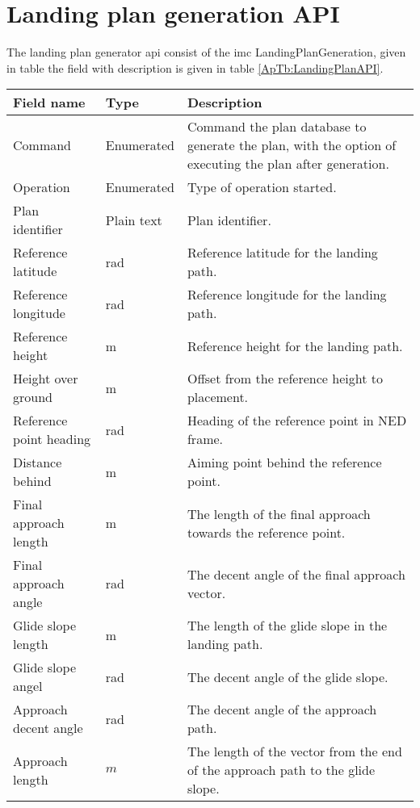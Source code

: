 \chapter{Landing plan generation API}\label{AP:APIIMC}
The landing plan generator \gls{api} consist of the \gls{imc} LandingPlanGeneration, given in table  the field with description is given in table \ref{ApTb:LandingPlanAPI}.
\begin{table}
\centering
\begin{tabular}{| p{4cm} | p{2cm} | p{6cm} |}
\hline
\textbf{Field name}	& \textbf{Type}	& \textbf{Description} \\ \hline
Command								& Enumerated	& Command the plan database to generate the plan, with the option of executing the plan after generation. \\ \hline
Operation							& Enumerated	& Type of operation started.	\\ \hline
Plan identifier						& Plain text	& Plan identifier.	\\ \hline
Reference latitude					& rad			& Reference latitude for the landing path.	\\ \hline
Reference longitude					& rad			& Reference longitude for the landing path.	\\ \hline
Reference height					& m				& Reference height for the landing path.	\\ \hline
Height over ground					& m				& Offset from the reference height to placement.	\\ \hline
Reference point heading				& rad			& Heading of the reference point in NED frame.	\\ \hline
Distance behind						& m				& Aiming point behind the reference point.	\\ \hline
Final approach length				& m				& The length of the final approach towards the reference point.	\\ \hline
Final approach angle				& rad			& The decent angle of the final approach vector. 	\\ \hline
Glide slope length					& m				& The length of the glide slope in the landing path.	\\ \hline
Glide slope angel					& rad			& The decent angle of the glide slope.	\\ \hline
Approach decent angle				& rad			& The decent angle of the approach path.	\\ \hline
Approach length						& $m$			& The length of the vector from the end of the approach path to the glide slope.	\\ \hline

\end{tabular}
\end{table}
